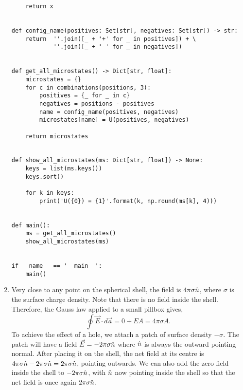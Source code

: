 \documentclass{article}
\begin{document}
\begin{enumerate}
\begin{verbatim}
    return x


def config_name(positives: Set[str], negatives: Set[str]) -> str:
    return  ''.join([_ + '+' for _ in positives]) + \
            ''.join([_ + '-' for _ in negatives])


def get_all_microstates() -> Dict[str, float]:
    microstates = {}
    for c in combinations(positions, 3):
        positives = {_ for _ in c}
        negatives = positions - positives    
        name = config_name(positives, negatives)
        microstates[name] = U(positives, negatives)

    return microstates


def show_all_microstates(ms: Dict[str, float]) -> None:
    keys = list(ms.keys())
    keys.sort()

    for k in keys:
        print('U({0}) = {1}'.format(k, np.round(ms[k], 4)))


def main():
    ms = get_all_microstates()
    show_all_microstates(ms)


if __name__ == '__main__':
    main()    
\end{verbatim}

\item Very close to any point on the spherical shell, the field is $4\pi\sigma\hat{n}$,
where $\sigma$ is the surface charge density. Note that there is no field inside
the shell. Therefore, the Gauss law applied to a small pillbox gives,
\[
\oint\vec{E}\cdot d\vec{a} = 0 + EA = 4\pi\sigma A.
\]
To achieve the effect of a hole, we attach a patch of surface density $-\sigma$.
The patch will have a field $\vec{E} = -2\pi\sigma\hat{n}$ where $\hat{n}$ is always the
outward pointing normal. After placing it on the shell, the net field at its 
centre is $4\pi\sigma\hat{n} - 2\pi\sigma\hat{n} = 2\pi\sigma\hat{n}$, pointing outwards.
We can also add the zero field inside the shell to $-2\pi\sigma\hat{n}$, with $\hat{n}$
now pointing inside the shell so that the net field is once again $2\pi\sigma\hat{n}$.


\end{enumerate}
\end{document}
